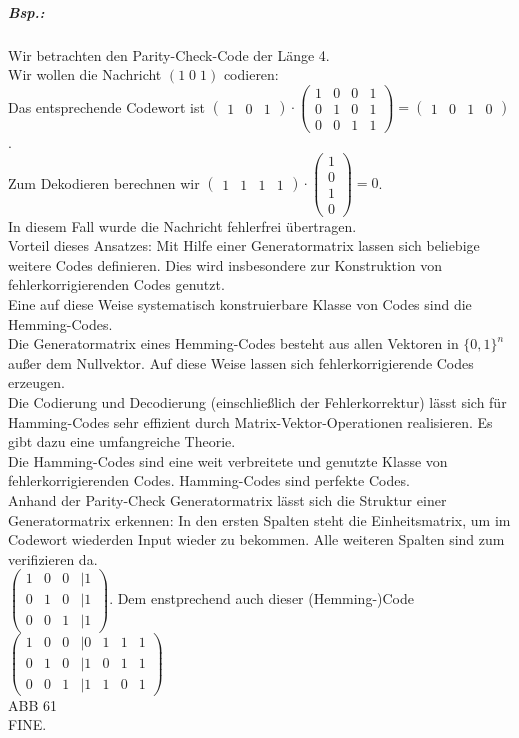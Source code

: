 \subparagraph{Bsp.:} Wir betrachten den Parity-Check-Code der Länge 4. \\
Wir wollen die Nachricht $(1\;0\;1)$ codieren:\\
Das entsprechende Codewort ist $\begin{pmatrix}
1 & 0 & 1
\end{pmatrix}\cdot \begin{pmatrix}
1 & 0 & 0 & 1\\
0 & 1 & 0 & 1 \\
0 & 0 & 1 & 1
\end{pmatrix}= \begin{pmatrix}
1 & 0 & 1 & 0
\end{pmatrix}$. \\
Zum Dekodieren berechnen wir $\begin{pmatrix}
1 & 1 & 1 & 1
\end{pmatrix}\cdot \begin{pmatrix}
1\\
0\\
1\\
0
\end{pmatrix}= 0$.\\
In diesem Fall wurde die Nachricht fehlerfrei übertragen.\bigskip\\
Vorteil dieses Ansatzes: Mit Hilfe einer Generatormatrix lassen sich beliebige weitere Codes definieren. Dies wird insbesondere zur Konstruktion von fehlerkorrigierenden Codes genutzt.\medskip\\
Eine auf diese Weise systematisch konstruierbare Klasse von Codes sind die Hemming-Codes.\\
Die Generatormatrix eines Hemming-Codes besteht aus allen Vektoren in $\{0,1\}^n$ außer dem Nullvektor. Auf diese Weise lassen sich fehlerkorrigierende Codes erzeugen.\\
Die Codierung und Decodierung (einschließlich der Fehlerkorrektur) lässt sich für Hamming-Codes sehr effizient durch Matrix-Vektor-Operationen realisieren. Es gibt dazu eine umfangreiche Theorie.\\
Die Hamming-Codes sind eine weit verbreitete und genutzte Klasse von fehlerkorrigierenden Codes. Hamming-Codes sind perfekte Codes.
\bigskip\\
Anhand der Parity-Check Generatormatrix lässt sich die Struktur einer Generatormatrix erkennen: In den ersten Spalten steht die Einheitsmatrix, um im Codewort wiederden Input wieder zu bekommen. Alle weiteren Spalten sind zum verifizieren da. \\
$\begin{pmatrix}
1 & 0 & 0 &| 1\\
0 & 1 & 0 &| 1\\
0 & 0 & 1 &| 1
\end{pmatrix}$. Dem enstprechend auch dieser (Hemming-)Code $\begin{pmatrix}
1 & 0 & 0 &| 0 & 1 & 1 & 1\\
0 & 1 & 0 &| 1 & 0 & 1 & 1\\
0 & 0 & 1 &| 1 & 1 & 0 & 1
\end{pmatrix}$\\
ABB 61
\bigskip \\
FINE.

\newpage
\printbibliography
